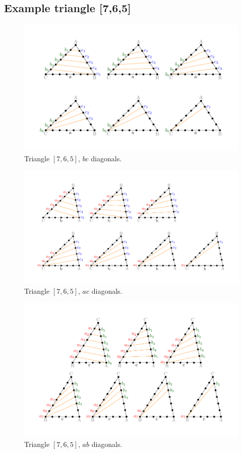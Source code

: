 \documentclass[11pt]{article}
\begin{document}
\subsection{Example triangle [7,6,5]}

\begin{figure}[htp]
\centering
\includegraphics[scale=1]{t765bc}
\caption{Triangle $[7,6,5]$, $bc$ diagonals.}
\label{t765bc}
\end{figure}

\begin{figure}[htp]
\centering
\includegraphics[scale=1]{t765ac}
\caption{Triangle $[7,6,5]$, $ac$ diagonals.}
\label{t765ac}
\end{figure}

\begin{figure}[htp]
\centering
\includegraphics[scale=1]{t765ab}
\caption{Triangle $[7,6,5]$, $ab$ diagonals.}
\label{t765ab}
\end{figure}
\end{document}
